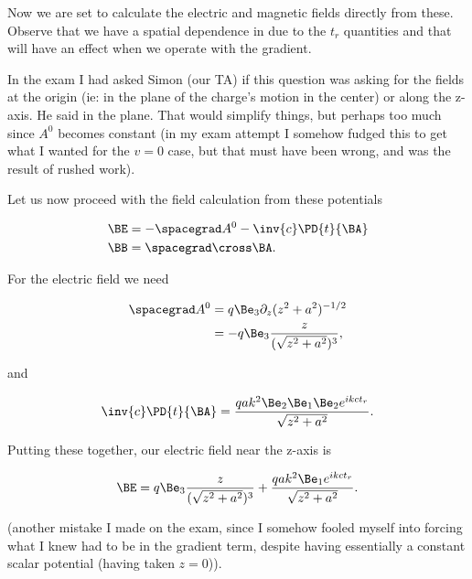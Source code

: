 {Now we are set to calculate the electric and magnetic fields directly from these.  Observe that we have a spatial dependence in due to the $t_r$ quantities and that will have an effect when we operate with the gradient.  

In the exam I had asked Simon (our TA) if this question was asking for the fields at the origin (ie: in the plane of the charge's motion in the center) or along the z-axis.  He said in the plane.  That would simplify things, but perhaps too much since $A^0$ becomes constant (in my exam attempt I somehow fudged this to get what I wanted for the $v = 0$ case, but that must have been wrong, and was the result of rushed work).

Let us now proceed with the field calculation from these potentials

\begin{equation}\label{eqn:relativisticElectrodynamicsExamReflection:190}
\begin{aligned}
\BE &= - \spacegrad A^0 - \inv{c} \PD{t}{\BA} \\
\BB &= \spacegrad \cross \BA.
\end{aligned}
\end{equation}

For the electric field we need

\begin{equation}\label{eqn:relativisticElectrodynamicsExamReflection:1170}
\begin{aligned}
\spacegrad A^0  
&= q \Be_3 \partial_z (z^2 + a^2)^{-1/2} \\
&= -q \Be_3 \frac{z}{(\sqrt{z^2 + a^2})^3},
\end{aligned}
\end{equation}

and

\begin{equation}\label{eqn:relativisticElectrodynamicsExamReflection:210}
\inv{c} \PD{t}{\BA} =
\frac{q a k^2 \Be_2 \Be_1 \Be_2 e^{i k c t_r} }{\sqrt{z^2 + a^2}}.
\end{equation}

Putting these together, our electric field near the z-axis is

\begin{equation}\label{eqn:relativisticElectrodynamicsExamReflection:230}
\BE = 
q \Be_3 \frac{z}{(\sqrt{z^2 + a^2})^3}
+
\frac{q a k^2 \Be_1 e^{i k c t_r} }{\sqrt{z^2 + a^2}}.
\end{equation}

(another mistake I made on the exam, since I somehow fooled myself into forcing what I knew had to be in the gradient term, despite having essentially a constant scalar potential (having taken $z = 0$)).

}
